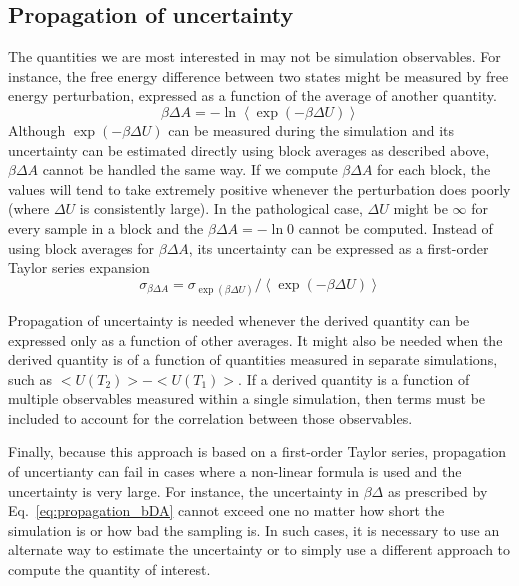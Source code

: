 \subsection{Propagation of uncertainty}

The quantities we are most interested in may not be simulation observables.  For instance, the free energy difference between two states might be measured by free energy perturbation, expressed as a function of the average of another quantity.
\begin{equation}
\beta \Delta A = -\ln \left< \exp \left(-\beta \Delta U\right) \right>
\end{equation}
Although $\exp(-\beta \Delta U)$ can be measured during the simulation and its uncertainty can be estimated directly using block averages as described above, $\beta \Delta A$ cannot be handled the same way.  If we compute $\beta \Delta A$ for each block, the values will tend to take extremely positive whenever the perturbation does poorly (where $\Delta U$ is consistently large).  In the pathological case, $\Delta U$ might be $\infty$ for every sample in a block and the $\beta \Delta A=-\ln 0$ cannot be computed. Instead of using block averages for $\beta \Delta A$, its uncertainty can be expressed as a first-order Taylor series expansion
\begin{equation}
  \sigma_{\beta \Delta A} = \sigma_{\exp(\beta \Delta U)} / \left< \exp \left(-\beta \Delta U\right) \right>
  \label{eq:propagation_bDA}
\end{equation}

Propagation of uncertainty is needed whenever the derived quantity can be expressed only as a function of other averages.  It might also be needed when the derived quantity is of a function of quantities measured in separate simulations, such as $<U(T_2)>-<U(T_1)>$.  If a derived quantity is a function of multiple observables measured within a single simulation, then terms must be included to account for the correlation between those observables.

Finally, because this approach is based on a first-order Taylor series, propagation of uncertianty can fail in cases where a non-linear formula is used and the uncertainty is very large.  For instance, the uncertainty in $\beta \Delta$ as prescribed by Eq.~\ref{eq:propagation_bDA} cannot exceed one no matter how short the simulation is or how bad the sampling is.  In such cases, it is necessary to use an alternate way to estimate the uncertainty or to simply use a different approach to compute the quantity of interest.

